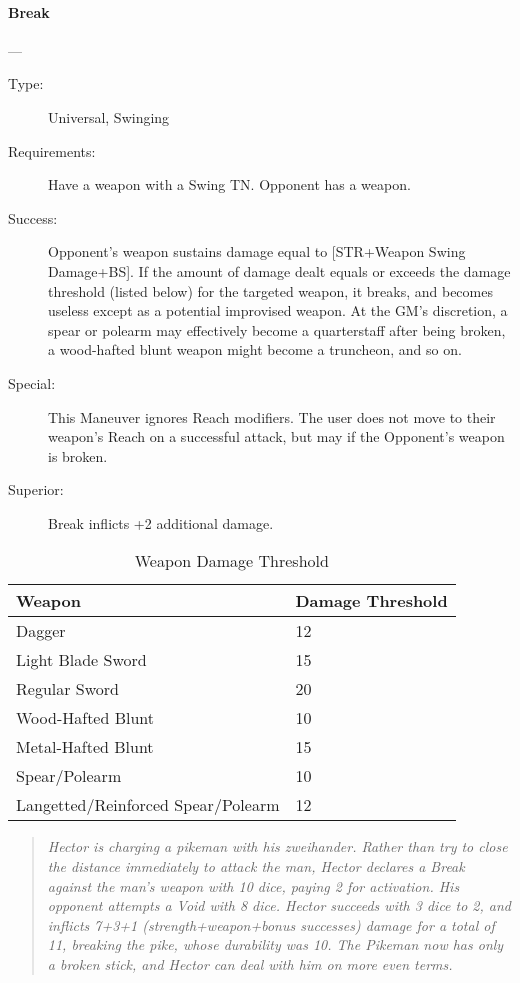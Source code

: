 \documentclass[oneside,11pt,english]{book}
\begin{document}
\paragraph{\large Break \label{man:Break}}---\quad{\large[X$ + $2]}
\vspace{-10pt}
\begin{description}
\item[Type:] Universal, Swinging
\item[Requirements:] Have a weapon with a Swing TN. Opponent has a weapon.
\item[Success:] Opponent’s weapon sustains damage equal to [STR+Weapon Swing
  Damage+BS]. If the amount of damage dealt equals or exceeds the damage
  threshold (listed below) for the targeted weapon, it breaks, and becomes
  useless except as a potential improvised weapon. At the GM’s discretion, a
  spear or polearm may effectively become a quarterstaff after being broken, a
  wood-hafted blunt weapon might become a truncheon, and so on.  
\item[Special:] This Maneuver ignores Reach modifiers. The user does not move to
  their weapon’s Reach on a successful attack, but may if the Opponent’s weapon
  is broken.  
\item[Superior:] Break inflicts +2 additional damage. 
\end{description}

\begin{table}[!h]
  \centering
  \caption{Weapon Damage Threshold}
  \label{tab:Weapon Damage Threshold}
  \begin{tabu} spread 0pt {XX[-1,r]}
    Weapon&Damage Threshold \\\toprule
    Dagger&12\\
    Light Blade Sword &15 \\
    Regular Sword &20 \\
    Wood-Hafted Blunt &10 \\
    Metal-Hafted Blunt&15 \\
    Spear/Polearm&10\\
    Langetted/Reinforced Spear/Polearm&12 \\
  \end{tabu}
\end{table}

\begin{quotation}
  \emph{Hector is charging a pikeman with his zweihander. Rather than try to
    close the distance immediately to attack the man, Hector declares a Break
    against the man’s weapon with 10 dice, paying 2 for activation. His opponent
    attempts a Void with 8 dice. Hector succeeds with 3 dice to 2, and inflicts
    7+3+1 (strength+weapon+bonus successes) damage for a total of 11, breaking
    the pike, whose durability was 10. The Pikeman now has only a broken stick,
    and Hector can deal with him on more even terms.} 
\end{quotation}
\end{document}

